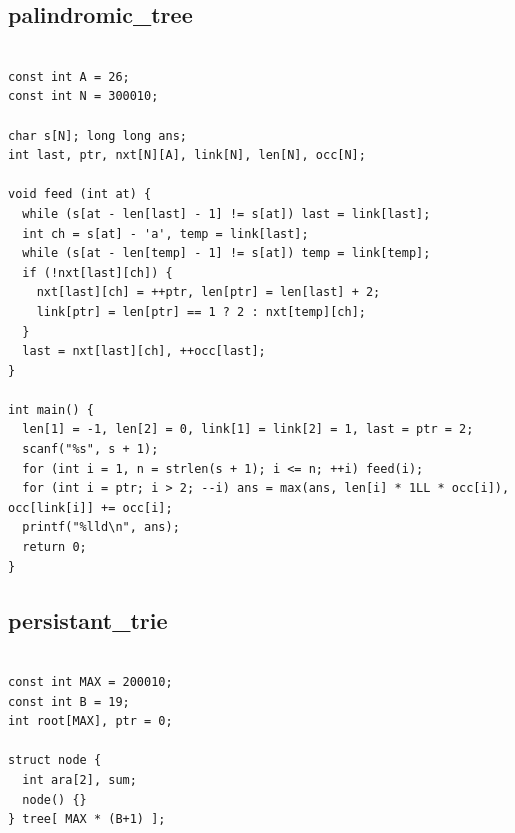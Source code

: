 \documentclass[9pt, landscape, a4paper,twosided]{extarticle}
\begin{document}
\begin{multicols*}{3}
\subsection{palindromic\_tree}
\begin{verbatim}

const int A = 26;
const int N = 300010;

char s[N]; long long ans;
int last, ptr, nxt[N][A], link[N], len[N], occ[N];

void feed (int at) {
  while (s[at - len[last] - 1] != s[at]) last = link[last];
  int ch = s[at] - 'a', temp = link[last];
  while (s[at - len[temp] - 1] != s[at]) temp = link[temp];
  if (!nxt[last][ch]) {
    nxt[last][ch] = ++ptr, len[ptr] = len[last] + 2;
    link[ptr] = len[ptr] == 1 ? 2 : nxt[temp][ch];
  }
  last = nxt[last][ch], ++occ[last];
}

int main() {
  len[1] = -1, len[2] = 0, link[1] = link[2] = 1, last = ptr = 2;
  scanf("%s", s + 1);
  for (int i = 1, n = strlen(s + 1); i <= n; ++i) feed(i);
  for (int i = ptr; i > 2; --i) ans = max(ans, len[i] * 1LL * occ[i]), occ[link[i]] += occ[i];
  printf("%lld\n", ans);
  return 0;
}
\end{verbatim}

\subsection{persistant\_trie}
\begin{verbatim}

const int MAX = 200010;
const int B = 19;
int root[MAX], ptr = 0;

struct node {
  int ara[2], sum;
  node() {}
} tree[ MAX * (B+1) ];


\end{verbatim}
\end{multicols*}
\end{document}
